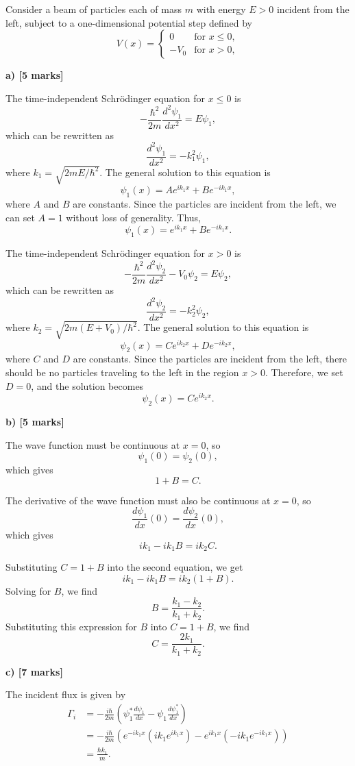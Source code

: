 \documentclass{article}
\begin{document}
Consider a beam of particles each of mass  $m$ with energy $E>0$ incident from the left, subject to a one-dimensional potential step defined by
\[
V(x) = 
\begin{cases}
0 & \text{for } x \leq 0, \\
-V_0 & \text{for } x > 0,
\end{cases}
\]

\textbf{a) [5 marks]}

The time-independent Schrödinger equation for $x \leq 0$ is
\[
-\frac{\hbar^2}{2m} \frac{d^2 \psi_1}{dx^2} = E \psi_1,
\]
which can be rewritten as
\[
\frac{d^2 \psi_1}{dx^2} = -k_1^2 \psi_1,
\]
where $k_1 = \sqrt{2mE/\hbar^2}$. The general solution to this equation is
\[
\psi_1(x) = Ae^{ik_1x} + Be^{-ik_1x},
\]
where $A$ and $B$ are constants. Since the particles are incident from the left, we can set $A = 1$ without loss of generality. Thus,
\[
\psi_1(x) = e^{ik_1x} + Be^{-ik_1x}.
\]

The time-independent Schrödinger equation for $x > 0$ is
\[
-\frac{\hbar^2}{2m} \frac{d^2 \psi_2}{dx^2} - V_0 \psi_2 = E \psi_2,
\]
which can be rewritten as
\[
\frac{d^2 \psi_2}{dx^2} = -k_2^2 \psi_2,
\]
where $k_2 = \sqrt{2m(E + V_0)/\hbar^2}$. The general solution to this equation is
\[
\psi_2(x) = Ce^{ik_2x} + De^{-ik_2x},
\]
where $C$ and $D$ are constants. Since the particles are incident from the left, there should be no particles traveling to the left in the region $x > 0$. Therefore, we set $D = 0$, and the solution becomes
\[
\psi_2(x) = Ce^{ik_2x}.
\]

\textbf{b) [5 marks]}

The wave function must be continuous at $x = 0$, so
\[
\psi_1(0) = \psi_2(0),
\]
which gives
\[
1 + B = C.
\]

The derivative of the wave function must also be continuous at $x = 0$, so
\[
\frac{d\psi_1}{dx}(0) = \frac{d\psi_2}{dx}(0),
\]
which gives
\[
ik_1 - ik_1B = ik_2C.
\]

Substituting $C = 1 + B$ into the second equation, we get
\[
ik_1 - ik_1B = ik_2(1 + B).
\]
Solving for $B$, we find
\[
B = \frac{k_1 - k_2}{k_1 + k_2}.
\]
Substituting this expression for $B$ into $C = 1 + B$, we find
\[
C = \frac{2k_1}{k_1 + k_2}.
\]

\textbf{c) [7 marks]}

The incident flux is given by
\begin{align*}
\Gamma_i &= -\frac{i\hbar}{2m} \left( \psi_1^* \frac{d\psi_1}{dx} - \psi_1 \frac{d\psi_1^*}{dx} \right) \\
&= -\frac{i\hbar}{2m} \left( e^{-ik_1x} (ik_1 e^{ik_1x}) - e^{ik_1x} (-ik_1 e^{-ik_1x}) \right) \\
&= \frac{\hbar k_1}{m}.
\end{align*}
\end{document}
